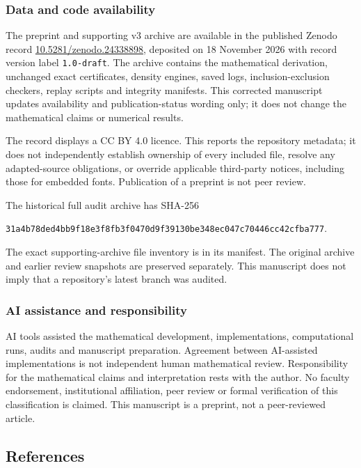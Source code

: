 \documentclass[
  11pt,
]{article}
\begin{document}
\subsubsection{Data and code
availability}\label{data-and-code-availability}

The preprint and supporting v3 archive are available in the published
Zenodo record \href{https://doi.org/10.5281/zenodo.24338898}{10.5281/zenodo.24338898},
deposited on 18 November 2026 with record version label \texttt{1.0-draft}.
The archive contains the mathematical derivation, unchanged exact
certificates, density engines, saved logs, inclusion-exclusion checkers,
replay scripts and integrity manifests. This corrected manuscript updates
availability and publication-status wording only; it does not change the
mathematical claims or numerical results. 

The record displays a CC BY 4.0 licence. This reports the repository
metadata; it does not independently establish ownership of every included
file, resolve any adapted-source obligations, or override applicable
third-party notices, including those for embedded fonts. Publication of a
preprint is not peer review.

The historical full audit archive has SHA-256

\texttt{31a4b78ded4bb9f18e3f8fb3f0470d9f39130be348ec047c70446cc42cfba777}.

The exact supporting-archive file inventory is in its manifest. The
original archive and earlier review snapshots are preserved separately.
This manuscript does not imply that a repository's latest branch was
audited.

\subsubsection{AI assistance and
responsibility}\label{ai-assistance-and-responsibility}

AI tools assisted the mathematical development, implementations,
computational runs, audits and manuscript preparation. Agreement between
AI-assisted implementations is not independent human mathematical
review. Responsibility for the mathematical claims and interpretation
rests with the author. No faculty endorsement, institutional
affiliation, peer review or formal verification of this classification
is claimed. This manuscript is a preprint, not a peer-reviewed article.

\subsection{References}\label{references}
\end{document}
